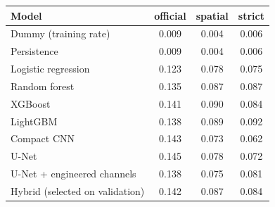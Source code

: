 \begin{tabular}{lccc}
\toprule
Model & official & spatial & strict \\
\midrule
Dummy (training rate) & 0.009 & 0.004 & 0.006 \\
Persistence & 0.009 & 0.004 & 0.006 \\
Logistic regression & 0.123 & 0.078 & 0.075 \\
Random forest & 0.135 & 0.087 & 0.087 \\
XGBoost & 0.141 & 0.090 & 0.084 \\
LightGBM & 0.138 & 0.089 & 0.092 \\
Compact CNN & 0.143 & 0.073 & 0.062 \\
U-Net & 0.145 & 0.078 & 0.072 \\
U-Net + engineered channels & 0.138 & 0.075 & 0.081 \\
Hybrid (selected on validation) & 0.142 & 0.087 & 0.084 \\
\bottomrule
\end{tabular}
